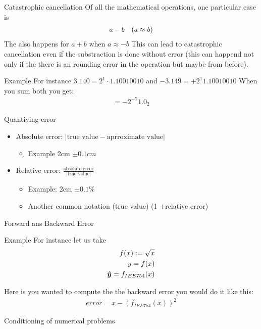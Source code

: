 \begin{parag}{Catastrophic cancellation}
    Of all the mathematical operations, one particular case is 
    \begin{align*} a - b \mathspace \left(a \approx b\right) \end{align*}
    The also happens for $a + b$ when $a \approx -b$ This can lead to catastrophic cancellation even if the substraction is done without error (this can happend not only if the there is an rounding error in the operation but maybe from before).
    \begin{subparag}{Example}
        For instance $3.140 = 2^1 \cdot 1.10010010$ and $-3.149 = + 2^1 1.10010010$
	When you sum both you get:
	\begin{align*} = -2^{-7} 1.0_2 \end{align*}
    \end{subparag}
\end{parag}


\begin{parag}{Quantiying error}
    \begin{itemize}
	    \item Absolute error: $\left|\text{true value} - \text{aprroximate value}\right|$
		    \begin{itemize}
			    \item Example 2cm $\pm 0.1 cm$
		    \end{itemize}
	    \item Relative error: $\frac{\text{absolute error}}{\left|\text{true value}\right|}$
		    \begin{itemize}
			    \item Example: 2cm $\pm 0.1 \%$
			    \item Another common notation (true value) (1 $\pm $relative error)
		    \end{itemize}
		    
    \end{itemize}
    
\end{parag}
\begin{parag}{Forward ans Backward Error}
    \begin{subparag}{Example}
        For instance let us take
	\begin{align*} f(x) := \sqrt{x} \\
	y =  f(x)\\
\bm{\hat{y}} = f_{IEE754}(x)\end{align*}
    \end{subparag}
    Here is you wanted to compute the the backward error you would do it like this:
    \begin{align*} error = x - \left(f_{IEE754}(x)\right)^2 \end{align*}
\end{parag}
\begin{parag}{Conditioning of numerical problems}
    
\end{parag}

